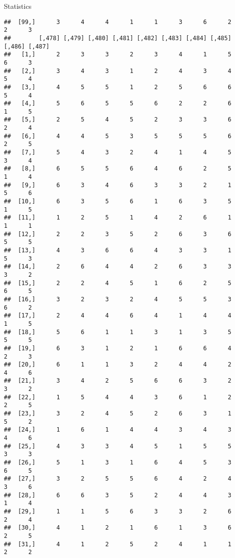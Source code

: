 \documentclass[
  ignorenonframetext,
]{beamer}
\begin{document}
\begin{frame}[fragile]{Statistics}
\begin{verbatim}
##  [99,]      3      4      4      1      1      3      6      2      2      3
##        [,478] [,479] [,480] [,481] [,482] [,483] [,484] [,485] [,486] [,487]
##   [1,]      2      3      3      2      3      4      1      5      6      3
##   [2,]      3      4      3      1      2      4      3      4      5      4
##   [3,]      4      5      5      1      2      5      6      6      5      4
##   [4,]      5      6      5      5      6      2      2      6      1      5
##   [5,]      2      5      4      5      2      3      3      6      2      4
##   [6,]      4      4      5      3      5      5      5      6      2      5
##   [7,]      5      4      3      2      4      1      4      5      3      4
##   [8,]      6      5      5      6      4      6      2      5      1      4
##   [9,]      6      3      4      6      3      3      2      1      5      6
##  [10,]      6      3      5      6      1      6      3      5      1      5
##  [11,]      1      2      5      1      4      2      6      1      1      1
##  [12,]      2      2      3      5      2      6      3      6      5      5
##  [13,]      4      3      6      6      4      3      3      1      5      3
##  [14,]      2      6      4      4      2      6      3      3      3      2
##  [15,]      2      2      4      5      1      6      2      5      6      5
##  [16,]      3      2      3      2      4      5      5      3      6      2
##  [17,]      2      4      4      6      4      1      4      4      1      5
##  [18,]      5      6      1      1      3      1      3      5      5      5
##  [19,]      6      3      1      2      1      6      6      4      2      3
##  [20,]      6      1      1      3      2      4      4      2      4      6
##  [21,]      3      4      2      5      6      6      3      2      3      2
##  [22,]      1      5      4      4      3      6      1      2      2      5
##  [23,]      3      2      4      5      2      6      3      1      5      2
##  [24,]      1      6      1      4      4      3      4      3      4      6
##  [25,]      4      3      3      4      5      1      5      5      3      3
##  [26,]      5      1      3      1      6      4      5      3      6      5
##  [27,]      3      2      5      5      6      4      2      4      3      6
##  [28,]      6      6      3      5      2      4      4      3      1      4
##  [29,]      1      1      5      6      3      3      2      6      2      4
##  [30,]      4      1      2      1      6      1      3      6      2      5
##  [31,]      4      1      2      5      2      4      1      1      2      2

\end{verbatim}
\end{frame}
\end{document}
